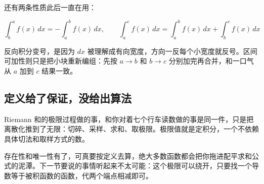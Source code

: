 还有两条性质此后一直在用：

\[
\int_b^a f(x)\,dx=-\int_a^b f(x)\,dx,\qquad \int_a^c f(x)\,dx=\int_a^b f(x)\,dx+\int_b^c f(x)\,dx
\]

反向积分变号，是因为 \(dx\) 被理解成有向宽度，方向一反每个小宽度就反号。区间可加性则只是把小块重新编组：先按 \(a\to b\) 和 \(b\to c\) 分别加完再合并，和一口气从 \(a\) 加到 \(c\) 结果一致。

\subsection{定义给了保证，没给出算法}

Riemann 和的极限过程做的事，和你对着七个行车读数做的事是同一件，只是把离散化推到了无限：切碎、采样、求和、取极限。极限值就是定积分，一个不依赖具体切法和取样方式的数。

存在性和唯一性有了，可真要按定义去算，绝大多数函数都会把你拖进配平求和公式的泥潭。下一节要说的事情听起来不太可能：这个极限可以绕开，只要找一个导数等于被积函数的函数，代两个端点相减即可。